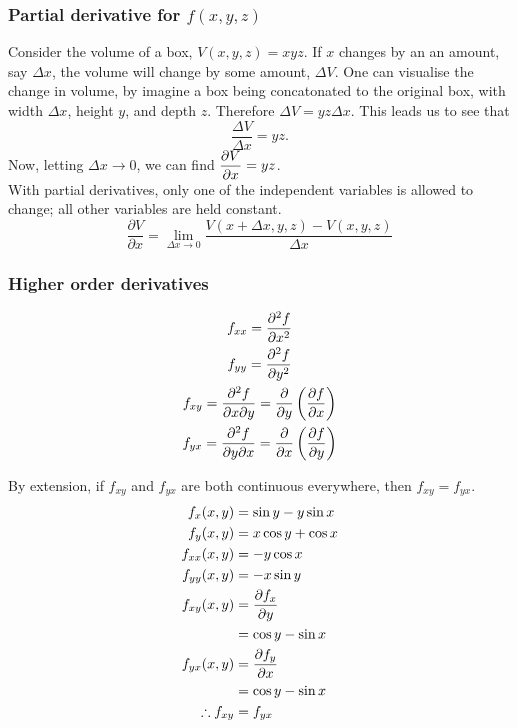 \documentclass{report}
\begin{document}
\subsubsection*{Partial derivative for $f(x,y,z)$}
Consider the volume of a box, $V(x,y,z) = xyz$. If $x$ changes by an an amount, say $\Delta x$, the volume will change by some amount, $\Delta V$. One can visualise the change in volume, by imagine a box being concatonated to the original box, with width $\Delta x$, height $y$, and depth $z$. Therefore $\Delta V = yz\Delta x$. This leads us to see that
$$
	\frac{\Delta V}{\Delta x} = yz.
$$
Now, letting $\Delta x\to 0$, we can find $\displaystyle{\frac{\partial V}{\partial x} = yz}$.\\
With partial derivatives, only one of the independent variables is allowed to change; all other variables are held constant.
$$
	\frac{\partial V}{\partial x} = \lim_{\Delta x \to 0} \frac{V(x+\Delta x, y, z) - V(x, y, z)}{\Delta x}
$$

\subsubsection*{Higher order derivatives}
\begin{multicols}{2}
	\noindent
	\begin{gather*}
		f_{xx} = \frac{\partial^{2} f}{\partial x^{2}} \\
		f_{yy} = \frac{\partial^{2} f}{\partial y^{2}} \\
		f_{xy} = \frac{\partial ^2f}{\partial x\partial y} = \frac{\partial }{\partial y}\left( \frac{\partial f}{\partial x} \right)\\
		f_{yx} = \frac{\partial ^2f}{\partial y\partial x} = \frac{\partial }{\partial x}\left( \frac{\partial f}{\partial y} \right)\\
	\end{gather*}
\end{multicols}
\noindent By extension, if $f_{xy}$ and $f_{yx}$ are both continuous everywhere, then $f_{xy} = f_{yx}$.
\sol
\begin{gather*}
	\begin{aligned}
		f_x(x,y) &= \sin y - y\sin x \\
		f_y(x,y) &= x\cos y + \cos x \\
		f_{xx}(x,y)  &= -y\cos x \\
		f_{yy}(x,y) &= -x\sin y \\
		f_{xy}(x,y) &= \frac{\partial f_x}{\partial y} \\
			&= \cos y - \sin x \\
		f_{yx}(x,y) &= \frac{\partial f_y}{\partial x} \\
			&= 	\cos y - \sin x \\
		\therefore f_{xy} &= f_{yx} 
	\end{aligned}
\end{gather*}
\end{document}
